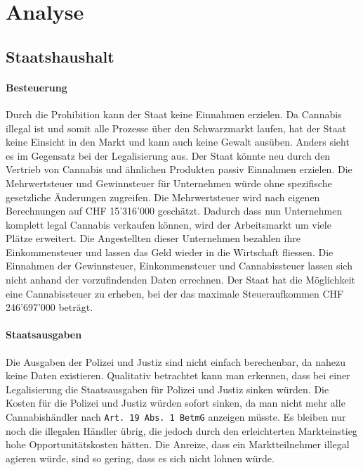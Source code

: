 \documentclass[../main.tex]{subfiles}
\begin{document}
	\section{Analyse}
		
	\subsection{Staatshaushalt}
		
	\paragraph{Besteuerung}
	Durch die Prohibition kann der Staat keine Einnahmen erzielen.
	Da Cannabis illegal ist und somit alle Prozesse über den Schwarzmarkt laufen, hat der Staat keine Einsicht in den Markt und kann auch keine Gewalt ausüben.
	Anders sieht es im Gegensatz bei der Legalisierung aus.
	Der Staat könnte neu durch den Vertrieb von Cannabis und ähnlichen Produkten passiv Einnahmen erzielen.
	Die Mehrwertsteuer und Gewinnsteuer für Unternehmen würde ohne spezifische gesetzliche Änderungen zugreifen.
	Die Mehrwertsteuer wird nach eigenen Berechnungen auf CHF 15'316'000 geschätzt.
	Dadurch dass nun Unternehmen komplett legal Cannabis verkaufen können, wird der Arbeitsmarkt um viele Plätze erweitert.
	Die Angestellten dieser Unternehmen bezahlen ihre Einkommensteuer und lassen das Geld wieder in die Wirtschaft fliessen.
	Die Einnahmen der Gewinnsteuer, Einkommensteuer und Cannabissteuer lassen sich nicht anhand der vorzufindenden Daten errechnen.
	Der Staat hat die Möglichkeit eine Cannabissteuer zu erheben, bei der das maximale Steueraufkommen CHF 246'697'000 beträgt.
	
	
	
	\paragraph{Staatsausgaben}
	Die Ausgaben der Polizei und Justiz sind nicht einfach berechenbar, da nahezu keine Daten existieren.
	Qualitativ betrachtet kann man erkennen, dass bei einer Legalisierung die Staatsausgaben für Polizei und Justiz sinken würden.
	Die Kosten für die Polizei und Justiz würden sofort sinken, da man nicht mehr alle Cannabishändler nach \texttt{Art. 19 Abs. 1 BetmG} anzeigen müsste.
	Es bleiben nur noch die illegalen Händler übrig, die jedoch durch den erleichterten Markteinstieg hohe Opportunitätskosten hätten.
	Die Anreize, dass ein Marktteilnehmer illegal agieren würde, sind so gering, dass es sich nicht lohnen würde.\\
	
\end{document}
